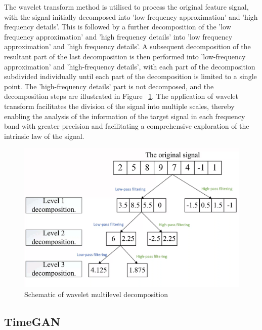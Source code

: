 \documentclass[journal,article,submit,pdftex,moreauthors]{Definitions/mdpi}
\begin{document}
The wavelet transform method is utilised to process the original feature signal, with the signal initially decomposed into 'low frequency approximation' and 'high frequency details'. This is followed by a further decomposition of the 'low frequency approximation' and 'high frequency details' into 'low frequency approximation' and 'high frequency details'. A subsequent decomposition of the resultant part of the last decomposition is then performed into 'low-frequency approximation' and 'high-frequency details', with each part of the decomposition subdivided individually until each part of the decomposition is limited to a single point. The 'high-frequency details' part is not decomposed, and the decomposition steps are illustrated in Figure ~\ref{fig:Wavelet Transform}. The application of wavelet transform facilitates the division of the signal into multiple scales, thereby enabling the analysis of the information of the target signal in each frequency band with greater precision and facilitating a comprehensive exploration of the intrinsic law of the signal.

\begin{figure}[H]
    \centering
    \includegraphics[width=0.75\linewidth]{图片/小波变换.png}
    \caption{Schematic of wavelet multilevel decomposition}
    \label{fig:Wavelet Transform}
\end{figure}


\subsection{TimeGAN }
\end{document}
